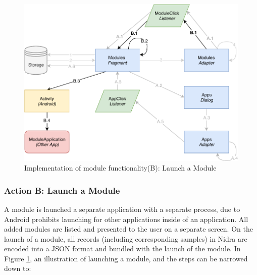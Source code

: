 \begin{figure}[!h]
    \centering
    \includegraphics[scale=0.7]{images/Module_ImpB.pdf}
    \caption{Implementation of module functionality(B): Launch a Module}
    \label{fig:impl_modulesB}
\end{figure}

\subsubsection{Action B: Launch a Module}
A module is launched a separate application with a separate process, due to Android prohibits launching for other applications inside of an application. All added modules are listed and presented to the user on a separate screen. On the launch of a module, all records (including corresponding samples) in Nidra are encoded into a JSON format and bundled with the launch of the module. In Figure \ref{fig:impl_modulesB}, an illustration of launching a module, and the steps can be narrowed down to:

